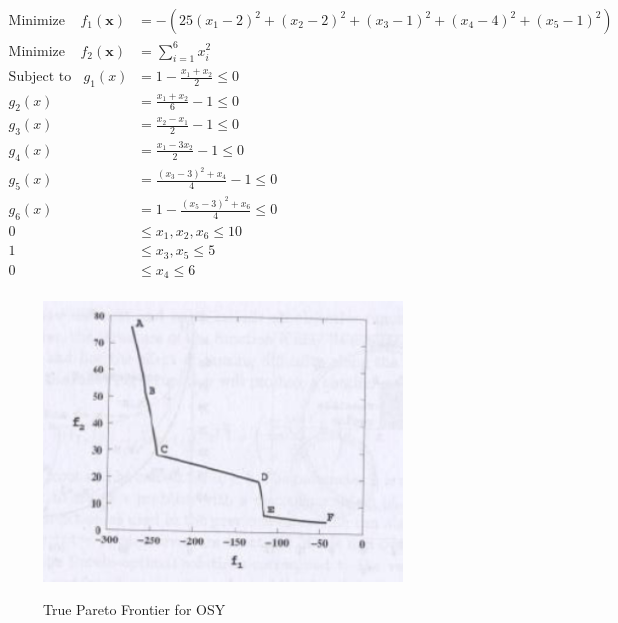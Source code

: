 \documentclass{article}
\begin{document}
\begin{align*}
\textrm{Minimize} ~~~~~ f_1(\textbf{x}) &= -(25(x_1-2)^2+(x_2-2)^2+(x_3-1)^2+(x_4-4)^2+(x_5-1)^2) \\
\textrm{Minimize} ~~~~~ f_2(\textbf{x}) &= \sum_{i=1}^{6}x_i^2 \\
\textrm{Subject to} ~~~~ g_1(x) &= 1-\frac{x_1+x_2}{2} \leq 0 \\
g_2(x) &= \frac{x_1+x_2}{6}-1 \leq 0 \\
g_3(x) &= \frac{x_2-x_1}{2}-1 \leq 0 \\
g_4(x) &= \frac{x_1-3x_2}{2}-1 \leq 0 \\
g_5(x) &= \frac{(x_3-3)^2+x_4}{4}-1 \leq 0 \\
g_6(x) &= 1-\frac{(x_5-3)^2+x_6}{4} \leq 0 \\
0 &\leq  x_1,x_2,x_6  \leq 10 \\
1 &\leq  x_3,x_5  \leq 5 \\
0 &\leq  x_4  \leq 6 \\
\end{align*}
\begin{figure}[H]
  \caption{True Pareto Frontier for OSY}
  \centering
  \includegraphics[width=0.85\textwidth]{OSY_pareto_true.png}  
  \label{fig:OSY_true}
\end{figure}
\end{document}
